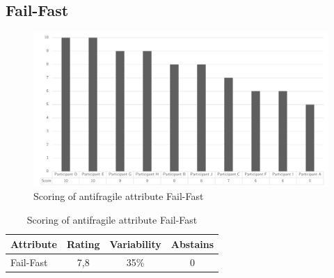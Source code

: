 \subsection{Fail-Fast}
\begin{figure}[H]
	\centering
	\includegraphics[width=0.9\linewidth]{images/scoreaffailfast}
	\caption[Scoring of antifragile attribute Fail-Fast]{Scoring of antifragile attribute Fail-Fast}
	\label{fig:appscoringaffailfast}
\end{figure}
\begin{table}[H]
	\centering
	\begin{tabular}{p{}ccc}
		\toprule
		\textbf{Attribute} & \textbf{Rating} & \textbf{Variability} & \textbf{Abstains} \\
		\midrule
		Fail-Fast & 7,8 & 35\% & 0 \\%
		\bottomrule
	\end{tabular}%
	\caption[Scoring of antifragile attribute Fail-Fast]{Scoring of antifragile attribute Fail-Fast}
	\label{tab:appscoringaffailfast}%
\end{table}%
\newpage
